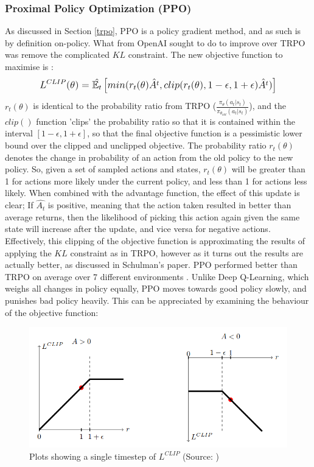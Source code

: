 \documentclass[12pt]{article}
\begin{document}
\subsubsection{Proximal Policy Optimization (PPO)}
As discussed in Section \ref{trpo}, PPO is a policy gradient method, and as such is by definition on-policy. What \textcite{schulman2017proximal} from OpenAI sought to do to improve over TRPO was remove the complicated $KL$ constraint. The new objective function to maximise is \autocite{schulman2017proximal}:
\begin{equation}\label{ppoupdate}
    \mathlarger{
        L^{CLIP}(\theta) = \hat{\mathbb{E}_t}\left[min(r_t(\theta)\hat{A^t},clip(r_t(\theta),1-\epsilon,1+\epsilon)\hat{A^t})\right]
    }
\end{equation}
$r_t(\theta)$ is identical to the probability ratio from TRPO ($\frac{\pi_\theta(a_t | s_t)}{\pi_{\theta_{old}}(a_t | s_t)}$), and the $clip()$ function 'clips' the probability ratio so that it is contained within the interval $[1-\epsilon,1+\epsilon]$, so that the final objective function is a pessimistic lower bound over the clipped and unclipped objective. 
The probability ratio $r_t(\theta)$ denotes the change in probability of an action from the old policy to the new policy. So, given a set of sampled actions and states, $r_t(\theta)$ will be greater than 1 for actions more likely under the current policy, and less than 1 for actions less likely. When combined with the advantage function, the effect of this update is clear; If $\hat{A_t}$ is positive, meaning that the action taken resulted in better than average returns, then the likelihood of picking this action again given the same state will increase after the update, and vice versa for negative actions. \\\newline
Effectively, this clipping of the objective function is approximating the results of applying the $KL$ constraint as in TRPO, however as it turns out the results are actually better, as discussed in Schulman's paper. PPO performed better than TRPO on average over 7 different environments \autocite{schulman2017proximal}. Unlike Deep Q-Learning, which weighs all changes in policy equally, PPO moves towards good policy slowly, and punishes bad policy heavily. This can be appreciated by examining the behaviour of the objective function:
\begin{figure}[H]
    \centering
    \includegraphics[scale=0.7]{8.png}
    \caption{Plots showing a single timestep of $L^{CLIP}$ (Source: \textcite{schulman2017proximal})}
    \label{ppoof}
\end{figure}
\end{document}
